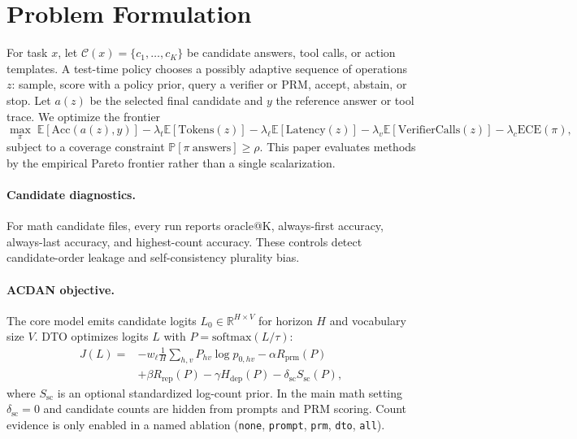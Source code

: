 \documentclass[letterpaper]{article} %
\begin{document}
\section{Problem Formulation}
For task $x$, let $\mathcal{C}(x)=\{c_1,\ldots,c_K\}$ be candidate answers,
tool calls, or action templates. A test-time policy chooses a possibly adaptive
sequence of operations $z$: sample, score with a policy prior, query a verifier
or PRM, accept, abstain, or stop. Let $a(z)$ be the selected final candidate and
$y$ the reference answer or tool trace. We optimize the frontier
\begin{equation}
\label{eq:frontier}
\max_\pi\;\mathbb{E}[\mathrm{Acc}(a(z),y)]
-\lambda_t \mathbb{E}[\mathrm{Tokens}(z)]
-\lambda_\ell \mathbb{E}[\mathrm{Latency}(z)]
-\lambda_v \mathbb{E}[\mathrm{VerifierCalls}(z)]
-\lambda_c \mathrm{ECE}(\pi),
\end{equation}
subject to a coverage constraint $\mathbb{P}[\pi\ \mathrm{answers}]\ge \rho$.
This paper evaluates methods by the empirical Pareto frontier rather than a
single scalarization.

\paragraph{Candidate diagnostics.}
For math candidate files, every run reports oracle@K, always-first accuracy,
always-last accuracy, and highest-count accuracy. These controls detect
candidate-order leakage and self-consistency plurality bias.

\paragraph{ACDAN objective.}
The core model emits candidate logits $L_0\in\mathbb{R}^{H\times V}$ for horizon
$H$ and vocabulary size $V$. DTO optimizes logits $L$ with
$P=\mathrm{softmax}(L/\tau)$:
\begin{equation}
\label{eq:dto}
\begin{aligned}
J(L)=&-w_\ell \textstyle\frac{1}{H}\sum_{h,v}P_{hv}\log p_{0,hv}
-\alpha R_{\mathrm{prm}}(P)\\
&+\beta R_{\mathrm{rep}}(P)
-\gamma H_{\mathrm{dep}}(P)
-\delta_{\mathrm{sc}}S_{\mathrm{sc}}(P),
\end{aligned}
\end{equation}
where $S_{\mathrm{sc}}$ is an optional standardized log-count prior. In the main
math setting $\delta_{\mathrm{sc}}=0$ and candidate counts are hidden from
prompts and PRM scoring. Count evidence is only enabled in a named ablation
(\texttt{none}, \texttt{prompt}, \texttt{prm}, \texttt{dto}, \texttt{all}).
\end{document}
